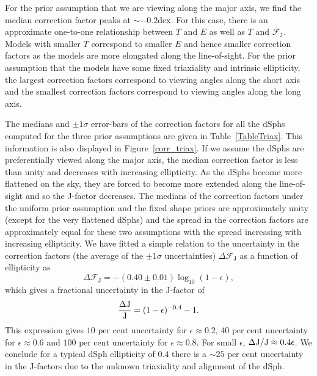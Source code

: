 \documentclass[prd,twocolumn,showpacs,preprintnumbers,superscriptaddress,nofootinbib,amsmath,amssymb,nobalancelastpage]{revtex4}
\def\percent{\text{ per cent}}
\def\percent{\text{ per cent}}
\newcommand{\Jf}{{\rm J}}
\begin{document}
For the prior assumption that we are viewing along the major axis, we find the median correction factor peaks at $\sim-0.2\mathrm{dex}$. For this case, there is an approximate one-to-one relationship between $T$ and $E$ as well as $T$ and $\mathcal{F}_\mathrm{J}$. Models with smaller $T$ correspond to smaller $E$ and hence smaller correction factors as the models are more elongated along the line-of-sight. For the prior assumption that the models have some fixed triaxiality and intrinsic ellipticity, the largest correction factors correspond to viewing angles along the short axis and the smallest correction factors correspond to viewing angles along the long axis.

The medians and $\pm1\sigma$ error-bars of the correction factors for all the dSphs computed for the three prior assumptions are given in Table~\ref{TableTriax}. This information is also displayed in Figure~\ref{corr_triax}. If we assume the dSphs are preferentially viewed along the major axis, the median correction factor is less than unity and decreases with increasing ellipticity. As the dSphs become more flattened on the sky, they are forced to become more extended along the line-of-sight and so the J-factor decreases. The medians of the correction factors under the uniform prior assumption and the fixed shape priors are approximately unity (except for the very flattened dSphs) and the spread in the correction factors are approximately equal for these two assumptions with the spread increasing with increasing ellipticity. We have fitted a simple relation to the uncertainty in the correction factors (the average of the $\pm1\sigma$ uncertainties) $\Delta \mathcal{F}_\mathrm{J}$ as a function of ellipticity as
\begin{equation}
\Delta\mathcal{F}_\mathrm{J} = -(0.40\pm0.01)\log_{10}(1-\epsilon),
\end{equation}
which gives a fractional uncertainty in the J-factor of
\begin{equation}
\frac{\Delta \Jf}{\Jf} = (1-\epsilon)^{-0.4}-1.
\end{equation}
This expression gives $10\percent$ uncertainty for $\epsilon\approx0.2$, $40\percent$ uncertainty for $\epsilon\approx0.6$ and $100\percent$ uncertainty for $\epsilon\approx0.8$. For small $\epsilon$, $\Delta \Jf/\Jf\approx 0.4\epsilon$. We conclude for a typical dSph ellipticity of $0.4$ there is a $\sim25\percent$ uncertainty in the J-factors due to the unknown triaxiality and alignment of the dSph.
\end{document}
